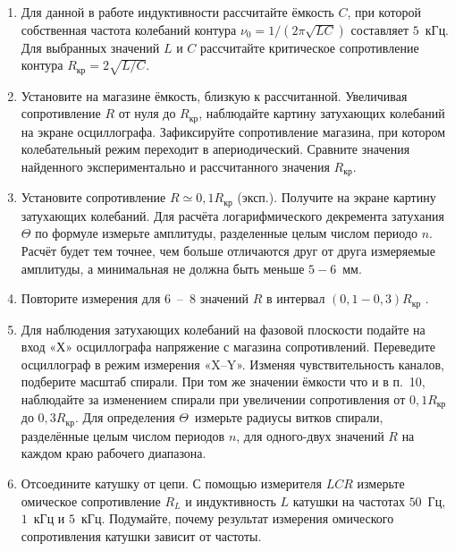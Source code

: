 \begin{lab:task}
\begin{enumerate}


	\item Для данной в работе индуктивности рассчитайте ёмкость $C$, при которой собственная частота колебаний контура $\nu_0 = 1/(2\pi\sqrt{LC})$ составляет $5$~кГц. Для выбранных значений $L$ и $C$ рассчитайте критическое сопротивление контура $R_\text{кр} = 2\sqrt{L/C}$. 

	\item Установите на магазине ёмкость, близкую к рассчитанной. Увеличивая сопротивление $R$ от нуля до  $R_\text{кр}$, наблюдайте картину затухающих колебаний на экране осциллографа. Зафиксируйте сопротивление магазина, при котором колебательный режим переходит в апериодический. Сравните значения найденного экспериментально и рассчитанного значения  $R_\text{кр}$.

	\item Установите сопротивление $R \simeq 0,1 R_\text{кр}$ (эксп.). Получите на экране картину затухающих колебаний. Для расчёта логарифмического декремента затухания $\Theta$ по формуле  измерьте амплитуды, разделенные целым числом периодо $n$. Расчёт будет тем точнее, чем больше отличаются друг от друга измеряемые амплитуды, а минимальная не должна быть меньше $5 - 6$~мм.

	\item Повторите измерения для 6~--~8 значений $R$ в интервал $(0,1-0,3)R_\text{кр}$ .



	\item Для наблюдения затухающих колебаний на фазовой плоскости подайте на вход «Х» осциллографа напряжение с магазина сопротивлений. Переведите осциллограф в режим измерения «X--Y». Изменяя чувствительность каналов, подберите масштаб спирали. При том же значении ёмкости что и в п.~10, наблюдайте за изменением спирали при увеличении сопротивления от $0,1R_\text{кр}$  до  $0,3R_\text{кр}$. Для определения $\Theta$~измерьте радиусы витков спирали, разделённые целым числом периодов $n$, для одного-двух значений $R$ на каждом краю рабочего диапазона.

	\item Отсоедините катушку от цепи. С помощью измерителя $LCR$ измерьте омическое сопротивление $R_L$ и индуктивность $L$ катушки на частотах $50$~Гц, $1$~кГц и $5$~кГц. Подумайте, почему результат измерения омического сопротивления катушки зависит от частоты.


\end{enumerate}
\end{lab:task}
